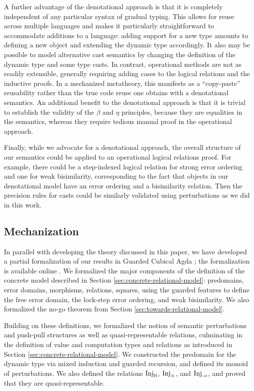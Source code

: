 A further advantage of the denotational approach is that it is completely
independent of any particular syntax of gradual typing. This allows for reuse
across multiple languages and makes it particularly straightforward to
accommodate additions to a language: adding support for a new type amounts to
defining a new object and extending the dynamic type accordingly. It also may be
possible to model alternative cast semantics by changing the definition of the
dynamic type and some type casts.
%
In contrast, operational methods are not as readily extensible, generally
requiring adding cases to the logical relations and the inductive proofs. In a
mechanized metatheory, this manifests as a ``copy-paste'' reusability rather than
the true code reuse one obtains with a denotational semantics.
%
An additional benefit to the denotational approach is that it is trivial to
establish the validity of the $\beta$ and $\eta$ principles, because they are
equalities in the semantics, whereas they require tedious manual proof in the
operational approach.

Finally, while we advocate for a denotational approach, the overall structure of
our semantics could be applied to an operational logical relations proof. For
example, there could be a step-indexed logical relation for strong error
ordering and one for weak bisimilarity, corresponding to the fact that objects
in our denotational model have an error ordering and a bisimilarity relation.
Then the precision rules for casts could be similarly validated using
perturbations as we did in this work.


\subsection{Mechanization}\label{sec:mechanization}
In parallel with developing the theory discussed in this paper, we have
developed a partial formalization of our results in Guarded Cubical Agda
\cite{veltri-vezzosi2020}; the formalization is available online \cite{artifact}.
%
We formalized the major components of the definition of the concrete model
described in Section \ref{sec:concrete-relational-model}: predomains, error
domains, morphisms, relations, squares, using the guarded
features to define the free error domain, the lock-step error ordering, and weak
bisimilarity. We also formalized the no-go theorem from Section
\ref{sec:towards-relational-model}.

Building on these definitions, we formalized the notion of semantic
perturbations and push-pull structures as well as quasi-representable relations,
culminating in the definition of value and computation types and relations as
introduced in Section \ref{sec:concrete-relational-model}.
%
%
We constructed the predomain for the dynamic type via mixed induction and
guarded recursion, and defined its monoid of perturbations. We also defined the
relations $\text{Inj}_\mathbb{N}$, $\text{Inj}_\times$, and $\text{Inj}_\to$, and proved that they are
quasi-representable.


